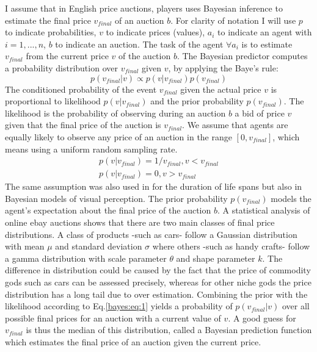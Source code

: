 I assume that in English price auctions, players uses Bayesian inference to
 estimate the final price $v_{final}$ of an auction $b$. For clarity of notation
 I will use $p$ to indicate probabilities, $v$ to indicate prices (values),
$a_i$ to indicate an agent with $i=1,...,n$, $b$ to indicate an auction.
The task of the agent $\forall a_i$ is to estimate $v_{final}$ from the
current price $v$ of the auction $b$.
The Bayesian predictor computes a probability distribution over $v_{final}$
given $v$, by applying the Baye's rule:
\begin{equation}
 p(v_{final}|v)\propto p(v|v_{final})p(v_{final})
\end{equation}
The conditioned probability of the event $v_{final}$ given the actual price $v$
 is proportional to likelihood $p(v|v_{final})$ and the prior probability $p(v_{final})$.
The likelihood is the probability of observing during an auction $b$ a bid of
 price $v$ given that the final price of the auction is $v_{final}$.
We assume that agents are equally likely to observe any price of an auction in the
 range $[0,v_{final}]$, which means using a uniform random sampling rate.
\begin{eqnarray}
p(v|v_{final})=1/v_{final},v<v_{final}\\
p(v|v_{final})=0,v>v_{final}
\label{bayes:eq:1}
\end{eqnarray}
The same assumption was also used in \citep{OptimalPredEveryDay} for the duration
 of life spans but also in Bayesian models of visual perception.
The prior probability $p(v_{final})$ models the agent's expectation about the
 final price of the auction $b$.
A statistical analysis of online ebay auctions shows that there are two main classes
 of final price distributions. A class of products -such as cars- follow a Gaussian
 distribution with mean $\mu$ and standard deviation $\sigma$ where others
-such as handy crafts- follow a gamma distribution with scale parameter $\theta$
and shape parameter $k$.
The difference in distribution could be caused by the fact that the price of
commodity gods such as cars can be assessed precisely, whereas for other niche
 gods the price distribution has a long tail due to over estimation.
Combining the prior with the likelihood according to Eq.\ref{bayes:eq:1} yields a
probability of $p(v_{final}|v)$ over all possible final prices for an auction
 with a current value of $v$.
A good guess for $v_{final}$ is thus the median of this distribution, called a
 Bayesian prediction function which estimates the final price of an auction
given the current price.
